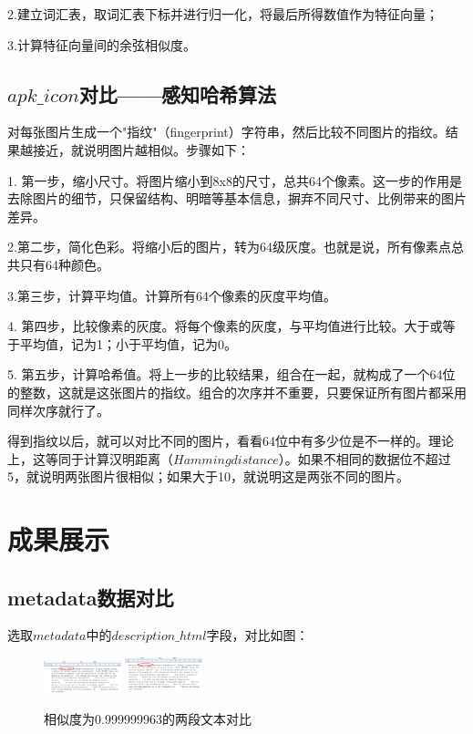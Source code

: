 \documentclass[UTF8,a4paper,10pt, twocolumn]{ctexart}
\begin{document}
2.建立词汇表，取词汇表下标并进行归一化，将最后所得数值作为特征向量；

3.计算特征向量间的余弦相似度。

\subsection{$apk\_icon$对比——感知哈希算法}
对每张图片生成一个"指纹"（fingerprint）字符串，然后比较不同图片的指纹。结果越接近，就说明图片越相似。步骤如下：

1. 第一步，缩小尺寸。将图片缩小到8x8的尺寸，总共64个像素。这一步的作用是去除图片的细节，只保留结构、明暗等基本信息，摒弃不同尺寸、比例带来的图片差异。

2.第二步，简化色彩。将缩小后的图片，转为64级灰度。也就是说，所有像素点总共只有64种颜色。

3.第三步，计算平均值。计算所有64个像素的灰度平均值。

4. 第四步，比较像素的灰度。将每个像素的灰度，与平均值进行比较。大于或等于平均值，记为1；小于平均值，记为0。

5. 第五步，计算哈希值。将上一步的比较结果，组合在一起，就构成了一个64位的整数，这就是这张图片的指纹。组合的次序并不重要，只要保证所有图片都采用同样次序就行了。

得到指纹以后，就可以对比不同的图片，看看64位中有多少位是不一样的。理论上，这等同于计算汉明距离（$Hamming distance$）。如果不相同的数据位不超过5，就说明两张图片很相似；如果大于10，就说明这是两张不同的图片。

\section{成果展示}
\subsection{metadata数据对比}
选取$metadata$中的$description\_html$字段，对比如图：

\begin{figure}[htbp]
\centering
\includegraphics[width=0.2\textwidth]{img/fig1.png}
\includegraphics[width=0.2\textwidth]{img/fig2.png}
\caption{相似度为0.999999963的两段文本对比}
\label{figure:zju1}
\end{figure}
\end{document}
